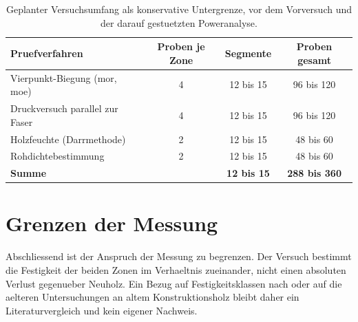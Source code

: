 \begin{table}[H]
\centering
\caption{Geplanter Versuchsumfang als konservative Untergrenze, vor dem
Vorversuch und der darauf gestuetzten Poweranalyse.}
\label{tab:versuchsplan}
\begin{tabularx}{\textwidth}{@{}Xccc@{}}
\toprule
\textbf{Pruefverfahren} & \textbf{Proben je Zone} & \textbf{Segmente} &
\textbf{Proben gesamt} \\
\midrule
Vierpunkt-Biegung (\acrshort{mor}, \acrshort{moe}) & 4 & 12 bis 15 & 96 bis 120 \\
Druckversuch parallel zur Faser & 4 & 12 bis 15 & 96 bis 120 \\
Holzfeuchte (Darrmethode) & 2 & 12 bis 15 & 48 bis 60 \\
Rohdichtebestimmung & 2 & 12 bis 15 & 48 bis 60 \\
\midrule
\textbf{Summe} & & \textbf{12 bis 15} & \textbf{288 bis 360} \\
\bottomrule
\end{tabularx}
\end{table}

\section{Grenzen der Messung}
\label{sec:grenzen-messung}

Abschliessend ist der Anspruch der Messung zu begrenzen. Der Versuch bestimmt
die Festigkeit der beiden Zonen im Verhaeltnis zueinander, nicht einen
absoluten Verlust gegenueber Neuholz. Ein Bezug auf Festigkeitsklassen nach
\textcite{en338} oder auf die aelteren Untersuchungen an altem
Konstruktionsholz \parencite{rug1989,ehlbeck1990} bleibt daher ein
Literaturvergleich und kein eigener Nachweis.
